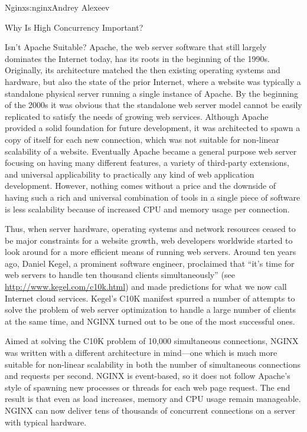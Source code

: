 \begin{aosachapter}{Nginx}{s:nginx}{Andrey Alexeev}
\begin{aosasect1}{Why Is High Concurrency Important?}
\begin{aosasect2}{Isn't Apache Suitable?}
Apache, the web server software that still largely dominates the
Internet today, has its roots in the beginning of the
1990s. Originally, its architecture matched the then existing
operating systems and hardware, but also the state of the prior
Internet, where a website was typically a standalone physical server
running a single instance of Apache. By the beginning of the 2000s it
was obvious that the standalone web server model cannot be easily
replicated to satisfy the needs of growing web services. Although
Apache provided a solid foundation for future development, it was
architected to spawn a copy of itself for each new connection, which
was not suitable for non-linear scalability of a website. Eventually
Apache became a general purpose web server focusing on having many
different features, a variety of third-party extensions, and universal
applicability to practically any kind of web application
development. However, nothing comes without a price and the downside
of having such a rich and universal combination of tools in a single
piece of software is less scalability because of increased CPU and
memory usage per connection.

Thus, when server hardware, operating systems and network resources
ceased to be major constraints for a website growth, web developers
worldwide started to look around for a more efficient means of running
web servers. Around ten years ago, Daniel Kegel, a prominent software
engineer, proclaimed that ``it's time for web servers to handle ten
thousand clients simultaneously'' (see
\url{http://www.kegel.com/c10k.html}) and made predictions for what we
now call Internet cloud services. Kegel's C10K manifest spurred a
number of attempts to solve the problem of web server optimization to
handle a large number of clients at the same time, and NGINX turned
out to be one of the most successful ones.

Aimed at solving the C10K problem of 10,000 simultaneous connections,
NGINX was written with a different architecture in mind---one which is
much more suitable for non-linear scalability in both the number of
simultaneous connections and requests per second. NGINX is
event-based, so it does not follow Apache's style of spawning new
processes or threads for each web page request. The end result is that
even as load increases, memory and CPU usage remain manageable. NGINX
can now deliver tens of thousands of concurrent connections on a
server with typical hardware.


\end{aosasect2}
\end{aosasect1}
\end{aosachapter}
